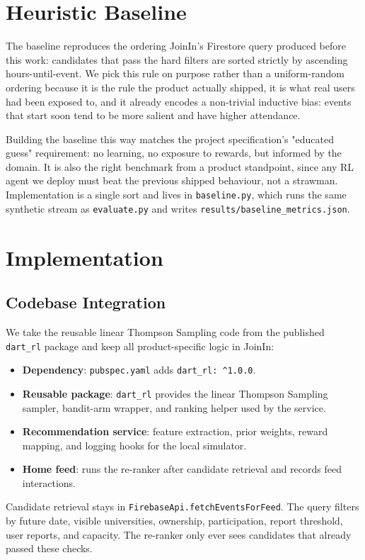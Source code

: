 \documentclass{article}
\begin{document}
\section{Heuristic Baseline}
The baseline reproduces the ordering JoinIn's Firestore query produced before this work: candidates that pass the hard filters are sorted strictly by ascending hours-until-event. We pick this rule on purpose rather than a uniform-random ordering because it is the rule the product actually shipped, it is what real users had been exposed to, and it already encodes a non-trivial inductive bias: events that start soon tend to be more salient and have higher attendance.

Building the baseline this way matches the project specification's "educated guess" requirement: no learning, no exposure to rewards, but informed by the domain. It is also the right benchmark from a product standpoint, since any RL agent we deploy must beat the previous shipped behaviour, not a strawman. Implementation is a single sort and lives in \texttt{baseline.py}, which runs the same synthetic stream as \texttt{evaluate.py} and writes \texttt{results/baseline\_metrics.json}.

\section{Implementation}
\subsection{Codebase Integration}
We take the reusable linear Thompson Sampling code from the published \texttt{dart\_rl} package and keep all product-specific logic in JoinIn:
\begin{itemize}
    \item \textbf{Dependency}: \texttt{pubspec.yaml} adds \texttt{dart\_rl: \^{}1.0.0}.
    \item \textbf{Reusable package}: \texttt{dart\_rl} provides the linear Thompson Sampling sampler, bandit-arm wrapper, and ranking helper used by the service.
    \item \textbf{Recommendation service}: feature extraction, prior weights, reward mapping, and logging hooks for the local simulator.
    \item \textbf{Home feed}: runs the re-ranker after candidate retrieval and records feed interactions.
\end{itemize}

Candidate retrieval stays in \texttt{FirebaseApi.fetchEventsForFeed}. The query filters by future date, visible universities, ownership, participation, report threshold, user reports, and capacity. The re-ranker only ever sees candidates that already passed these checks.
\end{document}
